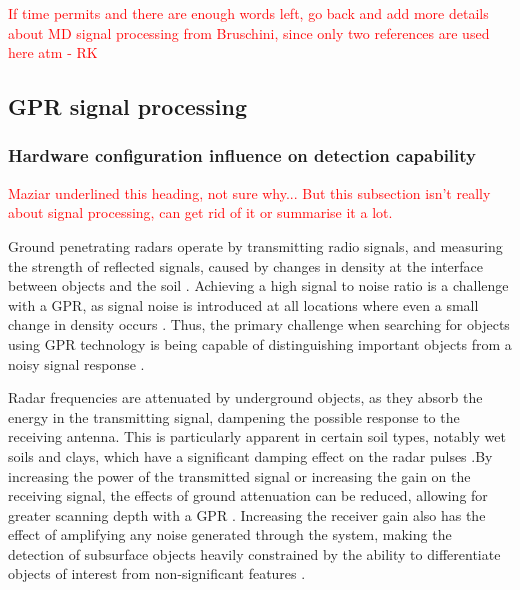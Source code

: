 \documentclass[main.tex]{subfiles}
\begin{document}
\textcolor{red}{If time permits and there are enough words left, go back and add more details about MD signal processing from Bruschini, since only two references are used here atm - RK}

\subsection{GPR signal processing}
\subsubsection{Hardware configuration influence on detection capability}
\textcolor{red}{Maziar underlined this heading, not sure why... But this subsection isn't really about signal processing, can get rid of it or summarise it a lot.}

Ground penetrating radars operate by transmitting radio signals, and measuring the strength of reflected signals, caused by changes in density at the interface between objects and the soil \parencite{sakaguchi2014}. Achieving a high signal to noise ratio is a challenge with a GPR, as signal noise is introduced at all locations where even a small change in density occurs \parencite{shresta2003}. Thus, the primary challenge when searching for objects using GPR technology is being capable of distinguishing important objects from a noisy signal response \parencite{sakaguchi2014}.

Radar frequencies are attenuated by underground objects, as they absorb the energy in the transmitting signal, dampening the possible response to the receiving antenna. This is particularly apparent in certain soil types, notably wet soils and clays, which have a significant damping effect on the radar pulses \parencite{sakaguchi2014}.By increasing the power of the transmitted signal or increasing the gain on the receiving signal, the effects of ground attenuation can be reduced, allowing for greater scanning depth with a GPR \parencite{Ho2008}. Increasing the receiver gain also has the effect of amplifying any noise generated through the system, making the detection of subsurface objects heavily constrained by the ability to differentiate objects of interest from non-significant features \parencite{shresta2003}. 
\end{document}

